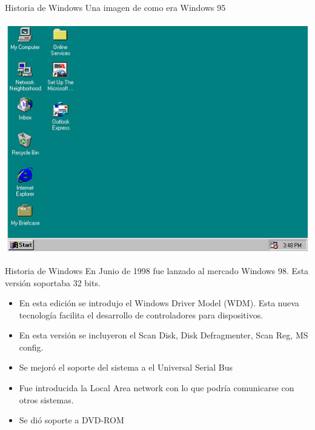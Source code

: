 \documentclass[11pt]{beamer}
\begin{document}
		\begin{frame}{Historia de Windows}
			Una imagen de como era Windows 95
			
			\includegraphics[scale=0.6]{w95.jpg}
		\end{frame}
		\begin{frame}{Historia de Windows}
			En Junio de 1998 fue lanzado al mercado Windows 98. Esta versión soportaba 32 bits.
			
			\begin{itemize}
				\item En esta edición se introdujo el Windows Driver Model (WDM). Esta nueva tecnología facilita el desarrollo de controladores para dispositivos.
				\item En esta versión se incluyeron el Scan Disk, Disk Defragmenter, Scan Reg, MS config.
				\item Se mejoró el soporte del sistema a el Universal Serial Bus
				\item Fue introducida la Local Area network con lo que podría comunicarse con otros sistemas.
				\item Se dió soporte a DVD-ROM
			\end{itemize}
		\end{frame}
\end{document}

